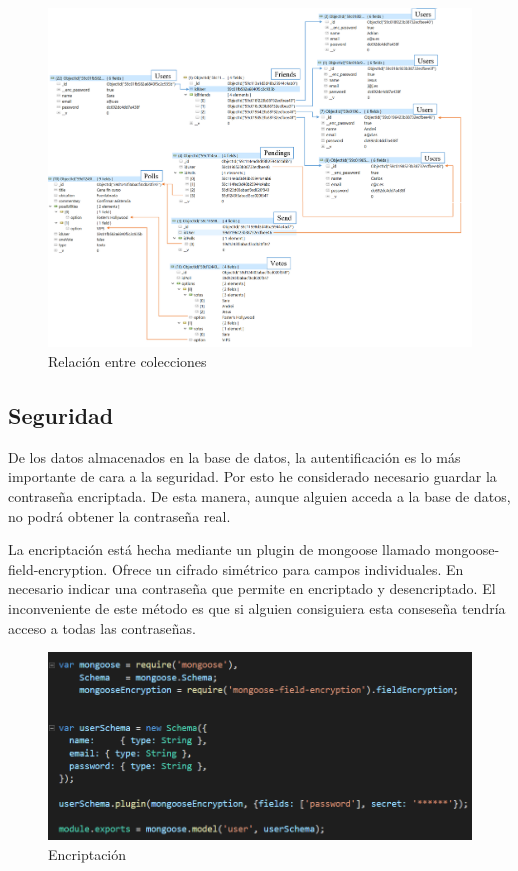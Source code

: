 \documentclass[a4paper, 12pt]{book}
\begin{document}
\begin{figure}[H]
  \centering
  \includegraphics[width=18.5cm, keepaspectratio]{img/base_datos.png}
  \caption{Relaci\'on entre colecciones}
  \label{f:}
\end{figure}


\subsection{Seguridad} 
\label{sec:seguridad}

De los datos almacenados en la base de datos, la autentificaci\'on es lo m\'as importante de cara a la seguridad. Por esto he considerado necesario guardar la contrase\~na encriptada. De esta manera, aunque alguien acceda a la base de datos, no podr\'a obtener la contrase\~na real.

La encriptaci\'on est\'a hecha mediante un plugin de mongoose llamado mongoose-field-encryption. Ofrece un cifrado sim\'etrico para campos individuales. En necesario indicar una contrase\~na que permite en encriptado y desencriptado. El inconveniente de este m\'etodo es que si alguien consiguiera esta consese\~na tendr\'ia acceso a todas las contrase\~nas.

\begin{figure}[H]
  \centering
  \includegraphics[width=12cm, keepaspectratio]{img/enc.png}
  \caption{Encriptaci\'on}
  \label{f:}
\end{figure}
\end{document}
